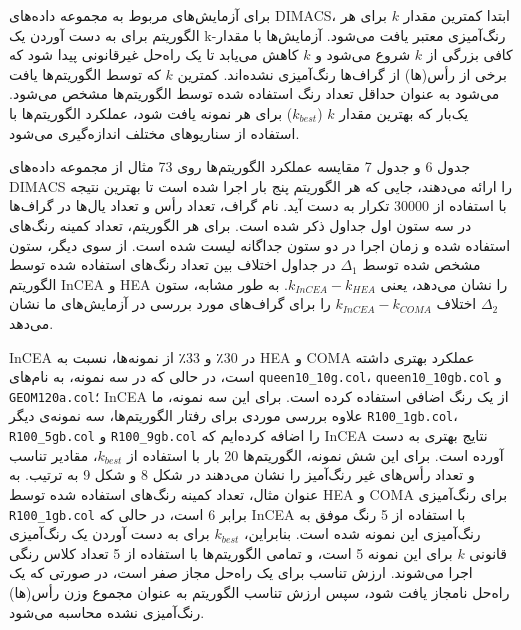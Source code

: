 \documentclass[a4paper,10pt]{article}
\begin{document}
            برای آزمایش‌های مربوط به مجموعه داده‌های DIMACS، ابتدا کمترین مقدار $k$ برای هر الگوریتم برای به دست آوردن یک k-رنگ‌آمیزی معتبر یافت می‌شود. آزمایش‌ها با مقدار کافی بزرگی از $k$ شروع می‌شود و $k$ کاهش می‌یابد تا یک راه‌حل غیرقانونی پیدا شود که برخی از رأس(ها) از گراف‌ها رنگ‌آمیزی نشده‌اند. کمترین $k$ که توسط الگوریتم‌ها یافت می‌شود به عنوان حداقل تعداد رنگ استفاده شده توسط الگوریتم‌ها مشخص می‌شود. یک‌بار که بهترین مقدار $k$ ($k_{best}$) برای هر نمونه یافت شود، عملکرد الگوریتم‌ها با استفاده از سناریوهای مختلف اندازه‌گیری می‌شود.

            جدول 6 و جدول 7 مقایسه عملکرد الگوریتم‌ها روی 73 مثال از مجموعه داده‌های DIMACS را ارائه می‌دهند، جایی که هر الگوریتم پنج بار اجرا شده است تا بهترین نتیجه با استفاده از 30000 تکرار به دست آید. نام گراف، تعداد رأس و تعداد یال‌ها در گراف‌ها در سه ستون اول جداول ذکر شده است. برای هر الگوریتم، تعداد کمینه رنگ‌های استفاده شده و زمان اجرا در دو ستون جداگانه لیست شده است. از سوی دیگر، ستون مشخص شده توسط $\Delta_1$ در جداول اختلاف بین تعداد رنگ‌های استفاده شده توسط الگوریتم InCEA و HEA را نشان می‌دهد، یعنی $k_{InCEA} - k_{HEA}$. به طور مشابه، ستون $\Delta_2$ اختلاف $k_{InCEA} - k_{COMA}$ را برای گراف‌های مورد بررسی در آزمایش‌های ما نشان می‌دهد.

            InCEA در 30٪ و 33٪ از نمونه‌ها، نسبت به HEA و COMA عملکرد بهتری داشته است، در حالی که در سه نمونه، به نام‌های \texttt{queen10\_10g.col}، \texttt{queen10\_10gb.col} و \texttt{GEOM120a.col}؛ InCEA از یک رنگ اضافی استفاده کرده است. برای این سه نمونه، ما علاوه بررسی موردی برای رفتار الگوریتم‌ها، سه نمونه‌ی دیگر \texttt{R100\_1gb.col}، \texttt{R100\_5gb.col} و \texttt{R100\_9gb.col} را اضافه کرده‌ایم که InCEA نتایج بهتری به دست آورده است. برای این شش نمونه، الگوریتم‌ها 20 بار با استفاده از $k_{best}$، مقادیر تناسب و تعداد رأس‌های غیر رنگ‌آمیز را نشان می‌دهند در شکل 8 و شکل 9 به ترتیب. به عنوان مثال، تعداد کمینه رنگ‌های استفاده شده توسط HEA و COMA برای رنگ‌آمیزی \texttt{R100\_1gb.col} برابر 6 است، در حالی که InCEA با استفاده از 5 رنگ موفق به رنگ‌آمیزی این نمونه شده است. بنابراین، $k_{best}$ برای به دست آوردن یک رنگ‌آمیزی قانونی $k$ برای این نمونه 5 است، و تمامی الگوریتم‌ها با استفاده از 5 تعداد کلاس رنگی اجرا می‌شوند. ارزش تناسب برای یک راه‌حل مجاز صفر است، در صورتی که یک راه‌حل نامجاز یافت شود، سپس ارزش تناسب الگوریتم به عنوان مجموع وزن رأس(ها) رنگ‌آمیزی نشده محاسبه می‌شود.
\end{document}
